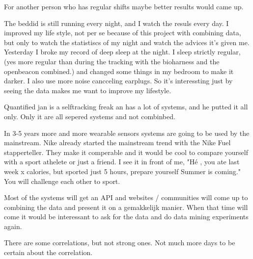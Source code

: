 	For another person who has regular shifts maybe better results would came up.


	The beddid is still running every night, and I watch the resuls every day. I improved my life style, not per se because of this project with combining data, but only to watch the statistiscs of my night and watch the advices it's given me. Yesterday I broke my record of deep sleep at the night. I sleep strictly regular, (yes more regular than during the tracking with the bioharness and the openbeacon combined.) and changed some things in my bedroom to make it darker. I also use more noise cancceling earplugs. So it's interessting just by seeing the data makes me want to improve my lifestyle. 

	Quantified jan is a selftracking freak an has a lot of systems, and he putted it all only. Only it are all sepered systems and not combinbed.

	In 3-5 years more and more wearable sensors systems are going to be used by the mainstream. Nike already started the mainstream trend with the Nike Fuel stapperteller. They make it comperable and it would be cool to compare yourself with a sport athelete or just a friend. I see it in front of me, "Hé , you ate last week x calories, but sported just 5 hours, prepare yourself Summer is coming." You will challenge each other to sport. 

	Most of the systems will get an API and websites / communities will come up to combining the data and present it on a gemakkelijk manier. When that time will come it would be interessant to ask for the data and do data mining experiments again. 


	There are some correlations, but not strong ones. Not much more days to be certain about the correlation.
	\fi
